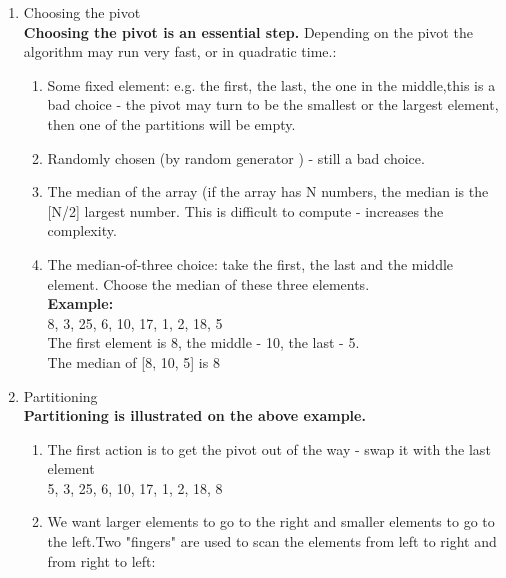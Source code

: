 \documentclass[10pt,a4paper]{article}
\begin{document}
	\begin{enumerate}
		\item Choosing the pivot \\ \textbf{ Choosing the pivot is an essential step.} Depending on the pivot the algorithm may run very fast, or in quadratic time.:
		\begin{enumerate}
			\item  Some fixed element: e.g. the first, the last, the one in the middle,this is a bad choice - the pivot may turn to be the smallest or the largest element, then one of the partitions will be empty.
			\item Randomly chosen (by random generator ) - still a bad choice. 
			\item The median of the array (if the array has N numbers, the median is the [N/2] largest number. This is difficult to compute - increases the complexity. 
			\item The median-of-three choice: take the first, the last and the middle element. Choose the median of these three elements. \\
			
			\textbf{Example:}\\
			8, 3, 25, 6, 10, 17, 1, 2, 18, 5 \\
			The first element is 8, the middle - 10, the last - 5. \\
			The median of [8, 10, 5] is 8
		\end{enumerate}
		
		\item Partitioning \\ \textbf{Partitioning is illustrated on the above example.}
		\begin{enumerate}
			\item The first action is to get the pivot out of the way - swap it with the last element \\
			5, 3, 25, 6, 10, 17, 1, 2, 18, 8\\
			\item  We want larger elements to go to the right and smaller elements to go to the left.Two "fingers" are used to scan the elements from left to right and from right to left:\\
			

\end{enumerate}
\end{enumerate}
\end{document}
